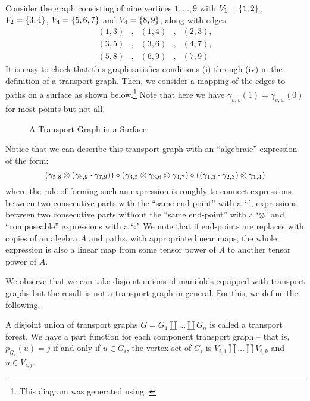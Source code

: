 \documentclass[./Thick_TQFTs_and_Quantum_Information.tex]{subfiles}
\begin{document}
\begin{exm}
Consider the graph consisting of nine vertices $1, \dots, 9$ with
$V_1 = \set{1, 2}$, $V_2 = \set{3, 4}$, $V_4 = \set{5, 6, 7}$ and
$V_4 = \set{8, 9}$, along with edges:
\[\begin{array}{ccccc}
  (1, 3) &,& (1, 4) &,& (2, 3),\\
  (3, 5) &,& (3, 6) &,& (4, 7),\\
  (5, 8) &,& (6, 9) &,& (7, 9)
\end{array}\]
It is easy to check that this graph satisfies conditions (i) through (iv) in the
definition of a transport graph. Then, we consider a mapping of the edges to
paths on a surface as shown below.\footnote{This diagram was generated using
\cite{Mathcha}.} Note that here we have $\gamma_{u, v}(1) = \gamma_{v, w}(0)$ for
most points but not all.
\begin{figure}[H]
\begin{center}

\end{center}
\caption{A Transport Graph in a Surface}
\end{figure}
Notice that we can describe this transport graph with an ``algebraic'' expression
of the form:
\[
  (\gamma_{5, 8} \otimes (\gamma_{6, 9} \cdot \gamma_{7, 9})) \circ
  (\gamma_{3, 5} \otimes \gamma_{3, 6} \otimes \gamma_{4, 7}) \circ
  ((\gamma_{1, 3} \cdot \gamma_{2, 3}) \otimes \gamma_{1, 4})
\]
where the rule of forming such an expression is roughly to connect
expressions between two consecutive parts with the ``same end point'' with a
`$\cdot$', expressions between two consecutive parts without the
``same end-point'' with a `$\otimes$' and ``composeable'' expressions with a
`$\circ$'. We note that if end-points are replaces with copies of an algebra $A$
and paths, with appropriate linear maps, the whole expression is also a linear
map from some tensor power of $A$ to another tensor power of $A$.
\end{exm}

We observe that we can take disjoint unions of manifolds equipped with transport
graphs but the result is not a transport graph in general. For this, we define
the following.

\begin{defn}
A disjoint union of transport graphs $G = G_1 \amalg \dots \amalg G_n$ is called
a transport forest. We have a part function for each component transport graph --
that is, $p_{G_i}(u) = j$ if and only if $u \in G_i$, the vertex set of $G_i$ is
$V_{i, 1} \amalg \dots \amalg V_{i, k}$ and $u \in V_{i, j}$.
\end{defn}
\end{document}
